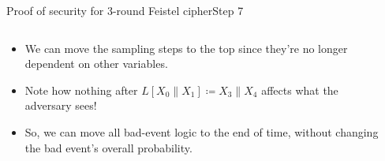 \documentclass[aspectratio=169, lualatex, handout]{beamer}
\begin{document}
\begin{frame}{Proof of security for 3-round Feistel cipher}{Step 7}
	\begin{columns}[c]
		\begin{column}{0.5\textwidth}
			\begin{itemize}
				\item We can move the sampling steps to the top since they're no longer dependent on other variables.
				\item Note how nothing after $L[X_0\|X_1] \coloneq X_3\|X_4$ affects what the adversary sees!
				\item So, we can move all bad-event logic to the end of time, without changing the bad event's overall probability.
			\end{itemize}
		\end{column}
		\begin{column}{0.5\textwidth}
			\vspace{-1.5cm}
			\begin{center}
			\end{center}
		\end{column}
	\end{columns}
\end{frame}
\end{document}
